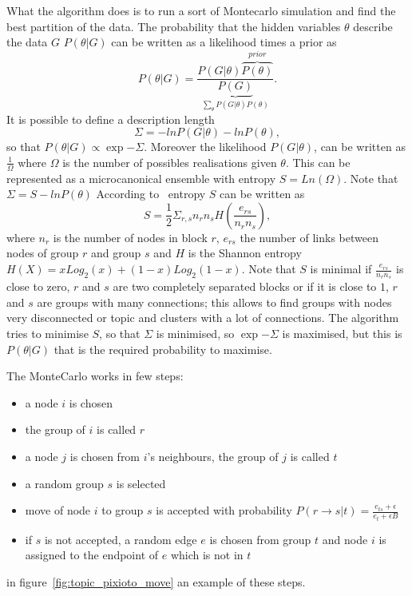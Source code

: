 What the algorithm does is to run a sort of Montecarlo simulation and find the best partition of the data.
The probability that the hidden variables $\theta$ describe the data $G$ $P(\theta | G)$ can be written as a likelihood times a prior as 
\[P(\theta|G)=\frac{P(G|\theta)\overbrace{P(\theta)}^{prior}}{\underbrace{P(G)}_{\sum_{\theta}P(G|\theta)P(\theta)}}.\]
It is possible to define a description length
\[
\Sigma=-lnP(G|\theta)-lnP(\theta),
\]
so that $P(\theta | G)\propto \exp{-\Sigma}$.
Moreover the likelihood $P(G | \theta)$, can be written as $\frac{1}{\Omega}$ where $\Omega$ is the number of possibles realisations given $\theta$. This can be represented as a microcanonical ensemble with entropy $S=Ln\left(\Omega\right)$.
Note that $\Sigma=S-lnP(\theta)$
According to~\cite{peixoto2017nonparametric} entropy $S$ can be written as
\[
S=\frac{1}{2}\Sigma_{r,s} n_rn_sH\left(\frac{e_{rs}}{n_rn_s}\right),
\]
where $n_r$ is the number of nodes in block $r$, $e_{rs}$ the number of links between nodes of group $r$ and group $s$ and $H$ is the Shannon entropy $H(X)=xLog_2(x)+(1-x)Log_2(1-x)$. Note that $S$ is minimal if $\frac{e_{rs}}{n_rn_s}$ is close to zero, $r$ and $s$ are two completely separated blocks or if it is close to $1$, $r$ and $s$ are groups with many connections; this allows to find groups with nodes very disconnected or topic and clusters with a lot of connections.
The algorithm tries to minimise $S$, so that $\Sigma$ is minimised, so $\exp{-\Sigma}$ is maximised, but this is $P(\theta | G)$ that is the required probability to maximise.

The MonteCarlo works in few steps:
\begin{itemize}
 \item a node $i$ is chosen
 \item the group of $i$ is called $r$
  \item a node $j$ is chosen from $i$'s neighbours, the group of $j$ is called $t$
  \item a random group $s$ is selected
  \item move of node $i$ to group $s$ is accepted with probability $P(r\to s|t)=\frac{e_{ts}+\epsilon}{e_t+\epsilon B}$
  \item if $s$ is not accepted, a random edge $e$ is chosen from group $t$ and node $i$ is assigned to the endpoint of $e$ which is not in $t$
\end{itemize}
in figure~\ref{fig:topic_pixioto_move} an example of these steps.


